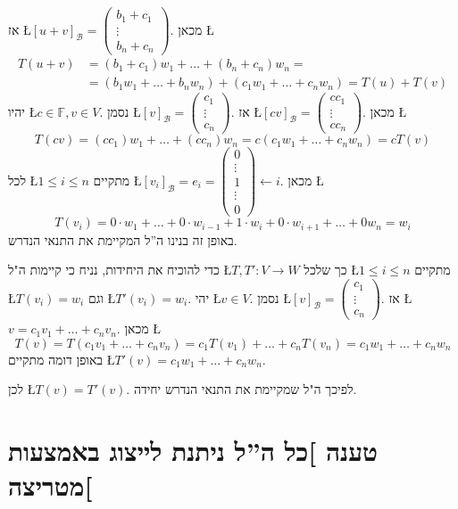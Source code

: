 \documentclass[english,hebrew]{article}
\begin{document}
אז \L{$[u+v]_{\mathcal{B}}=\begin{pmatrix}b_{1}+c_{1}\\
\vdots\\
b_{n}+c_{n}
\end{pmatrix}$}. מכאן \L{%
\[
\begin{aligned}T(u+v) & =(b_{1}+c_{1})w_{1}+\dots+(b_{n}+c_{n})w_{n}=\\
 & =(b_{1}w_{1}+\dots+b_{n}w_{n})+(c_{1}w_{1}+\dots+c_{n}w_{n})=T(u)+T(v)
\end{aligned}
\]
}%
יהיו \L{$c\in\mathbb{F},v\in V$}. נסמן \L{$[v]_{\mathcal{B}}=\begin{pmatrix}c_{1}\\
\vdots\\
c_{n}
\end{pmatrix}$}. אז \L{$[cv]_{\mathcal{B}}=\begin{pmatrix}cc_{1}\\
\vdots\\
cc_{n}
\end{pmatrix}$}. מכאן \L{%
\[
T(cv)=(cc_{1})w_{1}+\dots+(cc_{n})w_{n}=c(c_{1}w_{1}+\dots+c_{n}w_{n})=cT(v)
\]
}%
לכל \L{$1\le i\le n$} מתקיים \L{$[v_{i}]_{\mathcal{B}}=e_{i}=\begin{pmatrix}0\\
\vdots\\
1\\
\vdots\\
0
\end{pmatrix}\leftarrow i$}. מכאן \L{%
\[
T(v_{i})=0\cdot w_{1}+\dots+0\cdot w_{i-1}+1\cdot w_{i}+0\cdot w_{i+1}+\dots+0w_{n}=w_{i}
\]
}%
באופן זה בנינו ה\textquotedblright ל המקיימת את התנאי הנדרש.

כדי להוכיח את היחידות, נניח כי קיימות ה"ל \L{$T,T':V\to W$} כך שלכל
\L{$1\le i\le n$} מתקיים \L{$T(v_{i})=w_{i}$} וגם \L{$T'(v_{i})=w_{i}$}.
יהי \L{$v\in V$}. נסמן \L{$[v]_{\mathcal{B}}=\begin{pmatrix}c_{1}\\
\vdots\\
c_{n}
\end{pmatrix}$}. אז \L{$v=c_{1}v_{1}+\dots+c_{n}v_{n}$}. מכאן \L{%
\[
T(v)=T(c_{1}v_{1}+\dots+c_{n}v_{n})=c_{1}T(v_{1})+\dots+c_{n}T(v_{n})=c_{1}w_{1}+\dots+c_{n}w_{n}
\]
}%
באופן דומה מתקיים \L{$T'(v)=c_{1}w_{1}+\dots+c_{n}w_{n}$}.

לכן \L{$T(v)=T'(v)$}. לפיכך ה"ל שמקיימת את התנאי הנדרש יחידה.

\section{טענה {]}כל ה\textquotedblright ל ניתנת לייצוג באמצעות מטריצה{[}}
\end{document}
